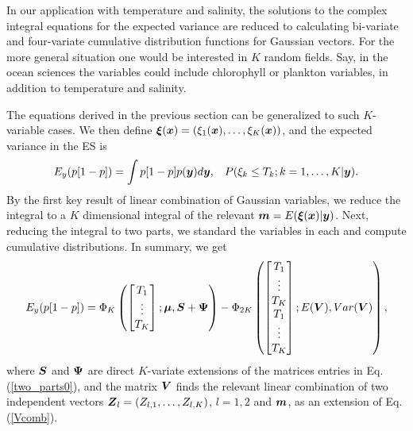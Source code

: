 \documentclass[aoas]{imsart}
\begin{document}
In our application with temperature and salinity, the solutions to the complex integral equations for the expected variance are reduced to calculating bi-variate and four-variate cumulative distribution functions for Gaussian vectors. For the more general situation one would be interested in $K$ random fields. Say, in the ocean sciences the variables could include chlorophyll or plankton variables, in addition to temperature and salinity. 

The equations derived in the previous section can be generalized to such $K$-variable cases. We then define ${\boldsymbol \xi}({\boldsymbol x})=(\xi_1({\boldsymbol x}),\ldots,\xi_K({\boldsymbol x}))$, and the expected variance in the ES is
\begin{equation}\label{two_partsK}
E_y(p[1-p]) = \int p[1-p] p(\by) d\by, \hspace{3mm} P(\xi_k \leq T_k ; k=1,\ldots,K|\by). 
\end{equation}
By the first key result of linear combination of Gaussian variables, we reduce the integral to a $K$ dimensional integral of the relevant ${\boldsymbol m}=E({\boldsymbol \xi}({\boldsymbol x})|{\boldsymbol y})$. Next, reducing the integral to two parts, we standard the variables in each and compute cumulative distributions. 
In summary, we get 
\begin{equation}\label{two_parts}
E_y(p[1-p]) =  \Phi_K 
\begin{pmatrix}
\begin{bmatrix} T_1\\
\vdots \\
T_K 
\end{bmatrix};
\bmu,\bS+\bPsi 
\end{pmatrix}
- \Phi_{2K} 
\begin{pmatrix}
\begin{bmatrix} T_1\\
\vdots \\
T_K \\
T_1\\
\vdots \\
T_K 
\end{bmatrix};
E(\bV),Var(\bV) 
\end{pmatrix},\nonumber
\end{equation}
where ${\boldsymbol S}$ and ${\boldsymbol \Psi}$ are direct $K$-variate extensions of the matrices entries in Eq. (\ref{two_parts0}), and the matrix ${\boldsymbol V}$ finds the relevant linear combination of two independent vectors ${\boldsymbol Z}_l=(Z_{l,1},\ldots,Z_{l,K})$, $l=1,2$ and ${\boldsymbol m}$, as an extension of Eq. (\ref{Vcomb}).

\end{document}
